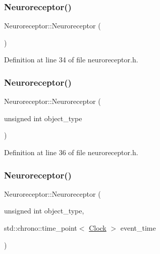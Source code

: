 \subsubsection{\texorpdfstring{Neuroreceptor()}{Neuroreceptor()}\hspace{0.1cm}{\footnotesize\ttfamily [1/4]}}
{\footnotesize\ttfamily Neuroreceptor\+::\+Neuroreceptor (\begin{DoxyParamCaption}{ }\end{DoxyParamCaption})\hspace{0.3cm}{\ttfamily [inline]}}



Definition at line 34 of file neuroreceptor.\+h.

\mbox{\label{class_neuroreceptor_a4628bf1ab69e010dc42b3adfd4dee72b}} 
\subsubsection{\texorpdfstring{Neuroreceptor()}{Neuroreceptor()}\hspace{0.1cm}{\footnotesize\ttfamily [2/4]}}
{\footnotesize\ttfamily Neuroreceptor\+::\+Neuroreceptor (\begin{DoxyParamCaption}\item[{unsigned int}]{object\+\_\+type }\end{DoxyParamCaption})\hspace{0.3cm}{\ttfamily [inline]}}



Definition at line 36 of file neuroreceptor.\+h.

\mbox{\label{class_neuroreceptor_a600273e92c3a4b076273d41fa58b58e9}} 
\subsubsection{\texorpdfstring{Neuroreceptor()}{Neuroreceptor()}\hspace{0.1cm}{\footnotesize\ttfamily [3/4]}}
{\footnotesize\ttfamily Neuroreceptor\+::\+Neuroreceptor (\begin{DoxyParamCaption}\item[{unsigned int}]{object\+\_\+type,  }\item[{std\+::chrono\+::time\+\_\+point$<$ \mbox{\hyperlink{universe_8h_a0ef8d951d1ca5ab3cfaf7ab4c7a6fd80}{Clock}} $>$}]{event\+\_\+time }\end{DoxyParamCaption})\hspace{0.3cm}{\ttfamily [inline]}}



